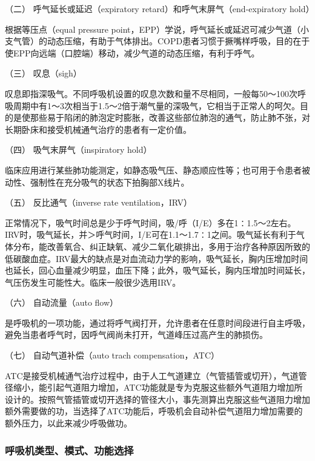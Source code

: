 \hypertarget{text00368.htmlux5cux23CHP16-3-2-2-2}{}
（二） 呼气延长或延迟（expiratory retard）和呼气末屏气（end-expiratory
hold）

根据等压点（equal pressure
point，EPP）学说，呼气延长或延迟可减少气道（小支气管）的动态压缩，有助于气体排出。COPD患者习惯于撅嘴样呼吸，目的在于使EPP向远端（口腔端）移动，减少气道的动态压缩，有利于呼气。

\hypertarget{text00368.htmlux5cux23CHP16-3-2-2-3}{}
（三） 叹息（sigh）

叹息即指深吸气。不同呼吸机设置的叹息次数和量不尽相同，一般每50～100次呼吸周期中有1～3次相当于1.5～2倍于潮气量的深吸气，它相当于正常人的呵欠。目的是使那些易于陷闭的肺泡定时膨胀，改善这些部位肺泡的通气，防止肺不张，对长期卧床和接受机械通气治疗的患者有一定价值。

\hypertarget{text00368.htmlux5cux23CHP16-3-2-2-4}{}
（四） 吸气末屏气（inspiratory hold）

临床应用进行某些肺功能测定，如静态吸气压、静态顺应性等；也可用于令患者被动性、强制性在充分吸气的状态下拍胸部X线片。

\hypertarget{text00368.htmlux5cux23CHP16-3-2-2-5}{}
（五） 反比通气（inverse rate ventilation，IRV）

正常情况下，吸气时间总是少于呼气时间，吸/呼（I/E）多在1∶1.5～2左右。IRV时，吸气延长，并＞呼气时间，I/E可在1.1～1.7∶1之间。吸气延长有利于气体分布，能改善氧合、纠正缺氧、减少二氧化碳排出，多用于治疗各种原因所致的低碳酸血症。IRV最大的缺点是对血流动力学的影响，吸气延长，胸内压增加时间也延长，回心血量减少明显，血压下降；此外，吸气延长，胸内压增加时间延长，气压伤发生可能性大。临床一般很少选用IRV。

\hypertarget{text00368.htmlux5cux23CHP16-3-2-2-6}{}
（六） 自动流量（auto flow）

是呼吸机的一项功能，通过将呼气阀打开，允许患者在任意时间段进行自主呼吸，避免当患者呼气时，因呼气阀尚未打开，气道峰压过高产生的肺损伤。

\hypertarget{text00368.htmlux5cux23CHP16-3-2-2-7}{}
（七） 自动气道补偿（auto trach compensation，ATC）

ATC是接受机械通气治疗过程中，由于人工气道建立（气管插管或切开），气道管径缩小，能引起气道阻力增加，ATC功能就是专为克服这些额外气道阻力增加所设计的。按照气管插管或切开选择的管径大小，事先测算出克服这些气道阻力增加额外需要做的功，当选择了ATC功能后，呼吸机会自动补偿气道阻力增加需要的额外压力，以此来减少呼吸做功。

\subsubsection{呼吸机类型、模式、功能选择}

